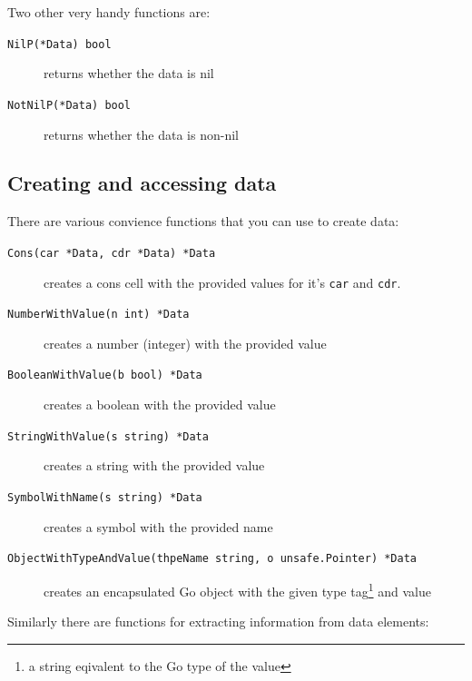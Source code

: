 \documentclass[12pt]{article}
\begin{document}
\noindent Two other very handy functions are:

\begin{description}
\item [{\tt NilP(*Data) bool}] returns whether the data is nil
\item [{\tt NotNilP(*Data) bool}] returns whether the data is non-nil
\end{description}

\subsection{Creating and accessing data}

There are various convience functions that you can use to create data:

\begin{description}
\item [{\tt Cons(car *Data, cdr *Data) *Data}] creates a cons cell
  with the provided values for it's \verb|car| and \verb|cdr|.
\item [{\tt NumberWithValue(n int) *Data}] creates a number (integer)
  with the provided value
\item [{\tt BooleanWithValue(b bool) *Data}] creates a boolean with
  the provided value
\item [{\tt StringWithValue(s string) *Data}] creates a string with
  the provided value
\item [{\tt SymbolWithName(s string) *Data}] creates a symbol with the
  provided name
\item [{\tt ObjectWithTypeAndValue(thpeName string, o unsafe.Pointer) *Data}]
  creates an encapsulated Go object with the given type tag\footnote{a
    string eqivalent to the Go type of the value} and value 
\end{description}

\noindent Similarly there are functions for extracting information
from data elements: 
\end{document}
